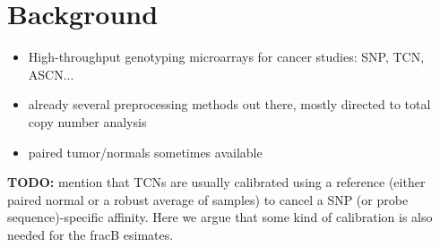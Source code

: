 \documentclass[10pt]{bmc_article}
\newenvironment{bmcformat}{\fussy\setboolean{publ}{true}}{\fussy}
\newenvironment{TODO}{\color{red}\textbf{TODO:}}{}
\begin{document}
\begin{bmcformat}




\section*{Background}
\label{secBackground}

\begin{itemize}
\item High-throughput genotyping microarrays for cancer studies: SNP, TCN, ASCN...
\item already several preprocessing methods out there, mostly directed to total copy number analysis
\item paired tumor/normals sometimes available
\end{itemize}

\begin{TODO}
  mention that TCNs are usually calibrated using a reference (either paired normal or a robust average of samples) to cancel a SNP (or probe sequence)-specific affinity. Here we argue that some kind of calibration is also needed for the fracB esimates.
\end{TODO}


\end{bmcformat}
\end{document}
